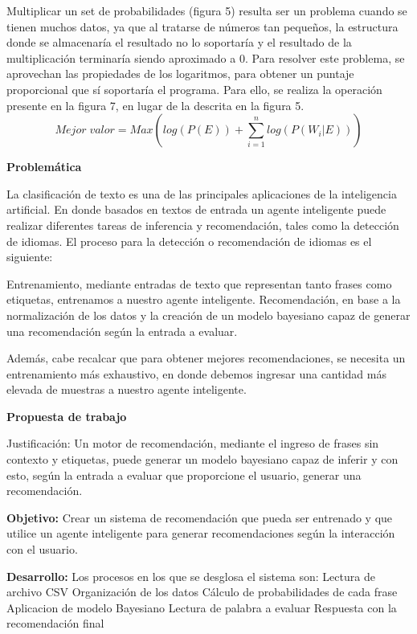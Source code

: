 \documentclass[sigconf]{acmart}
\begin{document}
Multiplicar un set de probabilidades (figura 5) resulta ser un problema cuando se tienen muchos datos, ya que al tratarse de números tan pequeños, la estructura donde se almacenaría el resultado no lo soportaría y el resultado de la multiplicación terminaría siendo aproximado a 0. Para resolver este problema, se aprovechan las propiedades de los logaritmos, para obtener un puntaje proporcional que sí soportaría el programa. Para ello, se realiza la operación presente en la figura 7, en lugar de la descrita en la figura 5.
 \newline
 \newline
 \newline
 \newline
 \newline
\begin{equation}
\label{eq:bayes6}
{Mejor\;valor} = Max(log(P(E)) + \sum_{i=1}^{n} log(P(W_i|E)))  
\end{equation}

\textbf{Problemática}

La clasificación de texto es una de las principales aplicaciones de la inteligencia artificial. En donde basados en textos de entrada un agente inteligente puede realizar diferentes tareas de inferencia y recomendación, tales como la detección de idiomas.
El proceso para la detección o recomendación de idiomas es el siguiente:

Entrenamiento, mediante entradas de texto que representan tanto frases como etiquetas, entrenamos a nuestro agente inteligente.
Recomendación, en base a la normalización de los datos y la creación de un modelo bayesiano capaz de generar una recomendación según la entrada a evaluar.

Además, cabe recalcar que para obtener mejores recomendaciones, se necesita un entrenamiento más exhaustivo, en donde debemos ingresar una cantidad más elevada de muestras a nuestro agente inteligente.


\textbf{Propuesta de trabajo}

Justificación: 
Un motor de recomendación, mediante el ingreso de frases sin contexto y etiquetas, puede generar un modelo bayesiano capaz de inferir y con esto, según la entrada a evaluar que proporcione el usuario, generar una recomendación.

\textbf{Objetivo:}
Crear un sistema de recomendación que pueda ser entrenado y que utilice un agente inteligente para generar recomendaciones según la interacción con el usuario.

\textbf{Desarrollo:}
Los procesos en los que se desglosa el sistema son:
Lectura de archivo CSV
Organización de los datos
Cálculo de probabilidades de cada frase
Aplicacion de modelo Bayesiano
Lectura de palabra a evaluar
Respuesta con la recomendación final
 \citep{Gupte}
\end{document}

